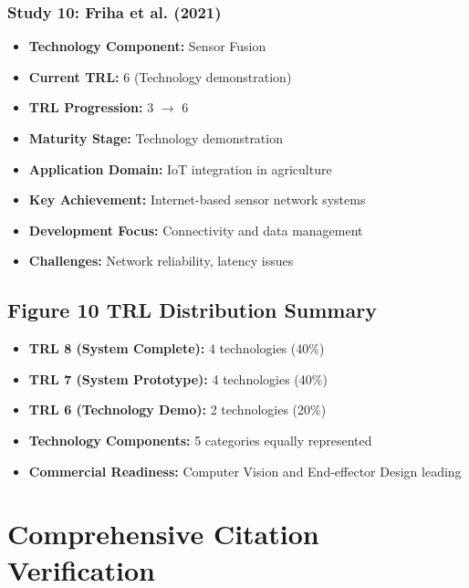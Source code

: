 \documentclass[11pt]{article}
\begin{document}
\subsubsection{Study 10: Friha et al. (2021) \cite{friha2021internet}}
\begin{itemize}
    \item \textbf{Technology Component:} Sensor Fusion
    \item \textbf{Current TRL:} 6 (Technology demonstration)
    \item \textbf{TRL Progression:} 3 $\rightarrow$ 6
    \item \textbf{Maturity Stage:} Technology demonstration
    \item \textbf{Application Domain:} IoT integration in agriculture
    \item \textbf{Key Achievement:} Internet-based sensor network systems
    \item \textbf{Development Focus:} Connectivity and data management
    \item \textbf{Challenges:} Network reliability, latency issues
\end{itemize}

\subsection{Figure 10 TRL Distribution Summary}
\begin{itemize}
    \item \textbf{TRL 8 (System Complete):} 4 technologies (40\%)
    \item \textbf{TRL 7 (System Prototype):} 4 technologies (40\%)
    \item \textbf{TRL 6 (Technology Demo):} 2 technologies (20\%)
    \item \textbf{Technology Components:} 5 categories equally represented
    \item \textbf{Commercial Readiness:} Computer Vision and End-effector Design leading
\end{itemize}

\section{Comprehensive Citation Verification}
\end{document}
